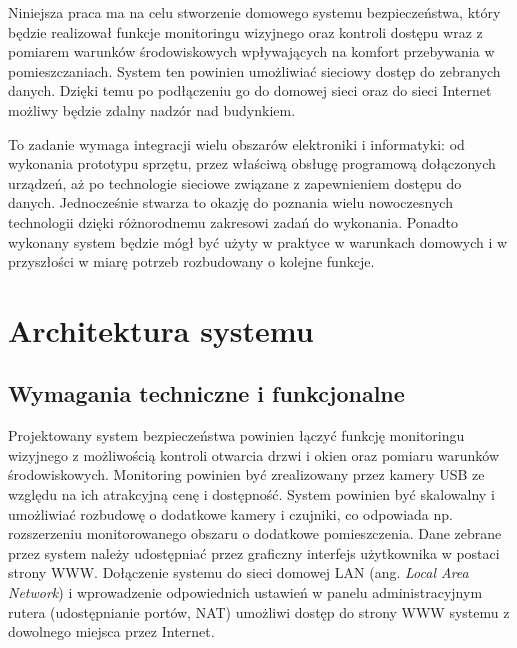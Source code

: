 \documentclass[a4paper,11pt,twoside]{article}
\begin{document}
Niniejsza praca ma na celu stworzenie domowego systemu bezpieczeństwa, który będzie realizował funkcje monitoringu wizyjnego oraz kontroli dostępu wraz z pomiarem warunków środowiskowych wpływających na komfort przebywania w pomieszczaniach. System ten powinien umożliwiać sieciowy dostęp do zebranych danych. Dzięki temu po podłączeniu go do domowej sieci oraz do sieci Internet możliwy będzie zdalny nadzór nad budynkiem. 

To zadanie wymaga integracji wielu obszarów elektroniki i informatyki: od wykonania prototypu sprzętu, przez właściwą obsługę programową dołączonych urządzeń, aż po technologie sieciowe związane z zapewnieniem dostępu do danych. Jednocześnie stwarza to okazję do poznania wielu nowoczesnych technologii dzięki różnorodnemu zakresowi zadań do wykonania. Ponadto wykonany system będzie mógł być użyty w praktyce w warunkach domowych i w przyszłości w miarę potrzeb rozbudowany o kolejne funkcje.



\newpage
\section{Architektura systemu}

\subsection{Wymagania techniczne i funkcjonalne}
Projektowany system bezpieczeństwa powinien łączyć funkcję monitoringu wizyjnego z możliwością kontroli otwarcia drzwi i okien oraz pomiaru warunków środowiskowych. Monitoring powinien być zrealizowany przez kamery USB ze względu na ich atrakcyjną cenę i dostępność. System powinien być skalowalny i umożliwiać rozbudowę o dodatkowe kamery i czujniki, co odpowiada np. rozszerzeniu monitorowanego obszaru o dodatkowe pomieszczenia. Dane zebrane przez system należy udostępniać przez graficzny interfejs użytkownika w postaci strony WWW. Dołączenie systemu do sieci domowej LAN (ang. \textit{Local Area Network}) i wprowadzenie odpowiednich ustawień w panelu administracyjnym rutera (udostępnianie portów, NAT) umożliwi dostęp do strony WWW systemu z dowolnego miejsca przez Internet.
\end{document}
